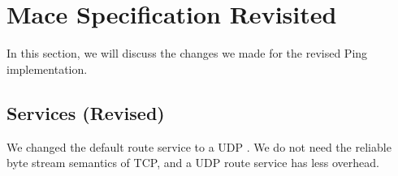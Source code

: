 % 
% 
% 
% 
% 
% 
\section{Mace Specification Revisited}
\label{sec:pingdetail}

In this section, we will discuss the changes we made for the revised
Ping implementation.


\subsection{Services (Revised)}

We changed the default route service to a UDP
.  We do not need the reliable byte
stream semantics of TCP, and a UDP route service has less overhead.

